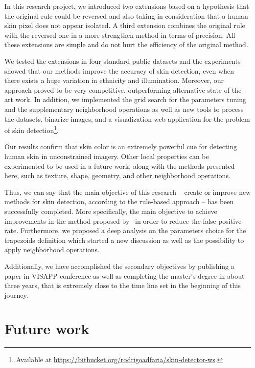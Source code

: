 In this research project, we introduced two extensions based on a hypothesis that the original rule could be reversed and also taking in consideration that a human skin pixel does not appear isolated. A third extension combines the original rule with the reversed one in a more strengthen method in terms of precision. All these extensions are simple and do not hurt the efficiency of the original method.

We tested the extensions in four standard public datasets and the experiments showed that our methods improve the accuracy of skin detection, even when there exists a huge variation in ethnicity and illumination. Moreover, our approach proved to be very competitive, outperforming alternative state-of-the-art work. In addition, we implemented the grid search for the parameters tuning and the supplementary neighborhood operations as well as new tools to process the datasets, binarize images, and a visualization web application for the problem of skin detection\footnote{Available at \url{https://bitbucket.org/rodrigoadfaria/skin-detector-ws}.}.

Our results confirm that skin color is an extremely powerful cue for detecting human skin in unconstrained imagery. Other local properties can be experimented to be used in a future work, along with the methods presented here, such as texture, shape, geometry, and other neighborhood operations.

Thus, we can say that the main objective of this research -- create or improve new methods for skin detection, according to the rule-based approach -- has been successfully completed. More specifically, the main objective to achieve improvements in the method proposed by~\citet{brancati:17} in order to reduce the false positive rate. Furthermore, we proposed a deep analysis on the parameters choice for the trapezoids definition which started a new discussion as well as the possibility to apply neighborhood operations.

Additionally, we have accomplished the secondary objectives by publishing a paper in VISAPP conference as well as completing the master's degree in about three years, that is extremely close to the time line set in the beginning of this journey.


\section{Future work}
\label{sec:future_work}


